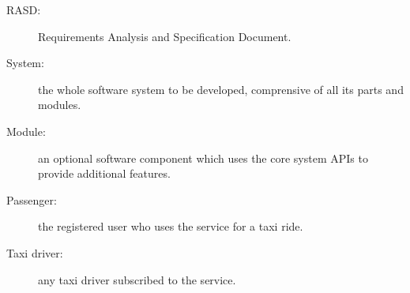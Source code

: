 \begin{description}
\item[RASD:] Requirements Analysis and Specification Document.
\item[System:] the whole software system to be developed, comprensive of all its parts and modules.
\item[Module:] an optional software component which uses the core system APIs to provide additional features.
\item[Passenger:] the registered user who uses the service for a taxi ride.
\item[Taxi driver:] any taxi driver subscribed to the service.
\end{description}
